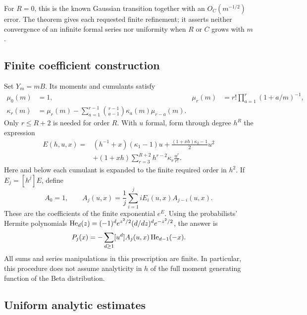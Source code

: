 \documentclass[11pt]{article}
\numberwithin{equation}{section}
\theoremstyle{remark}\newtheorem{remark}[theorem]{Remark}
\begin{document}
For $R=0$, this is the known Gaussian transition together with an
$O_C(m^{-1/2})$ error.  The theorem gives each requested finite refinement;
it asserts neither convergence of an infinite formal series nor
uniformity when $R$ or $C$ grows with $m$.

\subsection{Finite coefficient construction}

Set $Y_m=mB$.  Its moments and cumulants satisfy
\begin{align}
 \mu_0(m)&=1,&
 \mu_r(m)&=r!\prod_{a=1}^{r}(1+a/m)^{-1},\label{brs:eq:moments}\\
 \kappa_r(m)&=\mu_r(m)-\sum_{a=1}^{r-1}
 \binom{r-1}{a-1}\kappa_a(m)\mu_{r-a}(m).\label{brs:eq:cumulants}
\end{align}
Only $r\leq R+2$ is needed for order $R$.  With $u$ formal, form through
degree $h^R$ the expression
\begin{align}\label{brs:eq:E}
 E(h,u,x)={}&(h^{-1}+x)(\kappa_1-1)u
 +\frac{(1+xh)\kappa_2-1}{2}u^2\\
 &+(1+xh)\sum_{r=3}^{R+2}h^{r-2}\kappa_r\frac{u^r}{r!}.\nonumber
\end{align}
Here and below each cumulant is expanded to the finite required order in
$h^2$.  If $E_j=[h^j]E$, define
\begin{equation}\label{brs:eq:A}
 A_0=1,\qquad A_j(u,x)=\frac1j\sum_{i=1}^j iE_i(u,x)A_{j-i}(u,x).
\end{equation}
These are the coefficients of the finite exponential $e^E$.
Using the probabilists' Hermite polynomials
$\operatorname{He}_d(z)=(-1)^de^{z^2/2}(d/dz)^de^{-z^2/2}$, the answer is
\begin{equation}\label{brs:eq:Hermite}
 P_j(x)=-\sum_{d\geq1}[u^d]A_j(u,x)\operatorname{He}_{d-1}(-x).
\end{equation}
All sums and series manipulations in this prescription are finite.
In particular, this procedure does not assume analyticity in $h$ of the
full moment generating function of the Beta distribution.

\subsection{Uniform analytic estimates}
\end{document}
